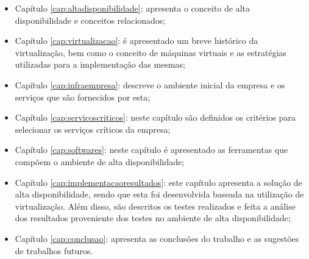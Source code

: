 \begin{itemize}
 \item Capítulo \ref{cap:altadisponibilidade}: apresenta o conceito de alta disponibilidade e conceitos relacionados;
 \item Capítulo \ref{cap:virtualizacao}: é apresentado um breve histórico da virtualização, bem como o conceito de máquinas virtuais e as 
 estratégias utilizadas para a implementação das mesmas;
 \item Capítulo \ref{cap:infraempresa}: descreve o ambiente inicial da empresa e os serviços que são fornecidos por esta;
 \item Capítulo \ref{cap:servicoscriticos}: neste capítulo são definidos os critérios para selecionar os serviços críticos da empresa;
 \item Capítulo \ref{cap:softwares}: neste capítulo é apresentado as ferramentas que compõem o ambiente de alta disponibilidade;
 \item Capítulo \ref{cap:implementacaoresultados}: este capítulo apresenta a solução de alta disponibilidade, sendo que esta foi desenvolvida 
 baseada na utilização de virtualização. Além disso, são descritos os testes realizados e feita a análise dos resultados proveniente dos testes 
 no ambiente de alta disponibilidade;
 \item Capítulo \ref{cap:conclusao}: apresenta as conclusões do trabalho e as sugestões de trabalhos futuros.
\end{itemize}

